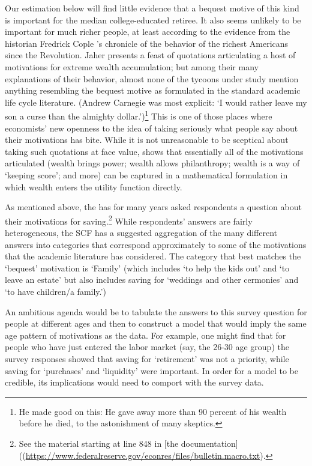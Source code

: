 \documentclass{article}
\begin{document}
Our estimation below will find little evidence that a bequest motive of this kind is important for the median college-educated retiree. It also seems unlikely to be important for much richer people, at least according to the evidence from the historian Fredrick Cople \cite{jaherGilded}'s chronicle of the behavior of the richest Americans since the Revolution. Jaher presents a feast of quotations articulating a host of motivations for extreme wealth accumulation; but among their many explanations of their behavior, almost none of the tycoons under study mention anything resembling the bequest motive as formulated in the standard academic life cycle literature. (Andrew Carnegie was most explicit: `I would rather leave my son a curse than the almighty dollar.')\footnote{He made good on this: He gave away more than 90 percent of his wealth before he died, to the astonishment of many skeptics.}  This is one of those places where economists' new openness to the idea of taking seriously what people say about their motivations has bite. While it is not unreasonable to be sceptical about taking such quotations at face value, \cite{WhyDoTheRich} shows that essentially all of the motivations articulated (wealth brings power; wealth allows philanthropy; wealth is a way of `keeping score'; and more) can be captured in a mathematical formulation in which wealth enters the utility function directly.

As mentioned above, the \cite{2023} has for many years asked respondents a question about their motivations for saving.\footnote{See the material starting at line 848 in [the documentation]((\href{https://www.federalreserve.gov/econres/files/bulletin.macro.txt}{https://www.federalreserve.gov/econres/files/bulletin.macro.txt}).} While respondents' answers are fairly heterogeneous, the SCF has a suggested aggregation of the many different answers into categories that correspond approximately to some of the motivations that the academic literature has considered.  The category that best matches the `bequest' motivation is `Family' (which includes `to help the kids out' and `to leave an estate' but also includes saving for `weddings and other cermonies' and  `to have children/a family.')

An ambitious agenda would be to tabulate the answers to this survey question for people at different ages and then to construct a model that would imply the same age pattern of motivations as the data.  For example, one might find that for people who have just entered the labor market (say, the 26-30 age group) the survey responses showed that saving for `retirement' was not a priority, while saving for `purchases' and `liquidity' were important. In order for a model to be credible, its implications would need to comport with the survey data.
\end{document}
